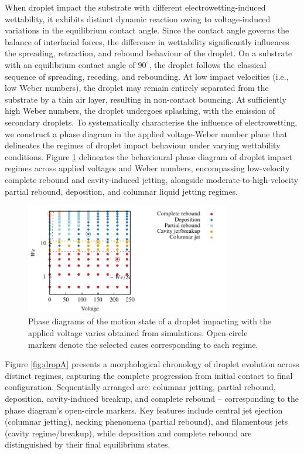 \documentclass[lineno]{cls/jfm}
\begin{document}
When droplet impact the substrate with different electrowetting-induced wettability, it exhibits distinct dynamic reaction owing to voltage-induced variations in the equilibrium contact angle. Since the contact angle governs the balance of interfacial forces, the difference in wettability significantly influences the spreading, retraction, and rebound behaviour of the droplet. On a substrate with an equilibrium contact angle of $90^\circ$, the droplet follows the classical sequence of spreading, receding, and rebounding. At low impact velocities (i.e., low Weber numbers), the droplet may remain entirely separated from the substrate by a thin air layer, resulting in non-contact bouncing. At sufficiently high Weber numbers, the droplet undergoes splashing, with the emission of secondary droplets. To systematically characterise the influence of electrowetting, we construct a phase diagram in the applied voltage-Weber number plane that delineates the regimes of droplet impact behaviour under varying wettability conditions. Figure \ref{fig:phase} delineates the behavioural phase diagram of droplet impact regimes across applied voltages and Weber numbers, encompassing low-velocity complete rebound and cavity-induced jetting, alongside moderate-to-high-velocity partial rebound, deposition, and columnar liquid jetting regimes.



 \begin{figure}
  \centerline{\includegraphics[width=0.8\textwidth]{fig/phase.pdf}}
  \caption{Phase diagrams of the motion state of a droplet impacting with the applied voltage varies obtained from simulations. Open-circle markers denote the selected cases corresponding to each regime.}
 \label{fig:phase}
 \end{figure}

 Figure \ref{fig:dropA} presents a morphological chronology of droplet evolution across distinct regimes, capturing the complete progression from initial contact to final configuration. Sequentially arranged are: columnar jetting, partial rebound, deposition, cavity-induced breakup, and complete rebound -- corresponding to the phase diagram's open-circle markers. Key features include central jet ejection (columnar jetting), necking phenomena (partial rebound), and filamentous jets (cavity regime/breakup), while deposition and complete rebound are distinguished by their final equilibrium states.
\end{document}
